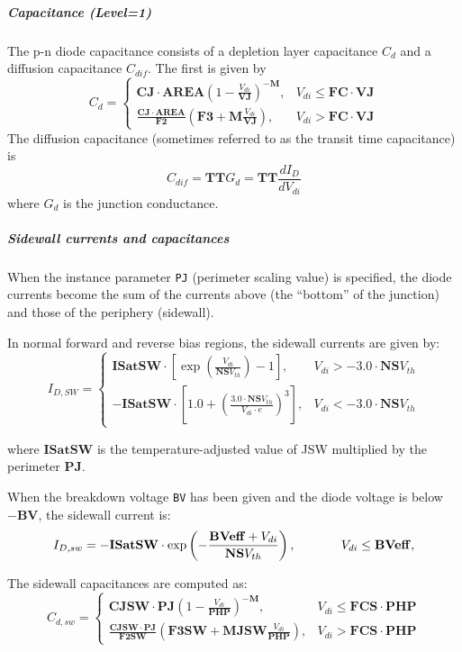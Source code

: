 \subparagraph{Capacitance (Level=1)}
The p-n diode capacitance consists of a depletion layer capacitance $C_d$ and a
diffusion capacitance $C_{dif}$.  The first is given by
\[
C_d = \left\{ \begin{array}{ll}
\mathbf{CJ}\cdot\mathbf{AREA} \left(1-\frac{V_{di}}{\mathbf{VJ}} \right)^{-\mathbf{M}}, &
V_{di} \leq \mathbf{FC \cdot VJ} \\
\frac{\mathbf{CJ}\cdot\mathbf{AREA}}{\mathbf{F2}}\left(\mathbf{F3}+\mathbf{M}\frac{V_{di}}{\mathbf{VJ}}\right),
& V_{di} > \mathbf{FC \cdot VJ}
\end{array}
\right.
\]
The diffusion capacitance (sometimes referred to as the transit time
capacitance) is
\[
C_{dif} = \mathbf{TT}G_d = \mathbf{TT}\frac{dI_D}{dV_{di}}
\]
where $G_d$ is the junction conductance.

\subparagraph{Sidewall currents and capacitances}
When the instance parameter \texttt{PJ} (perimeter scaling value) is
specified, the diode currents become the sum of the currents above
(the ``bottom'' of the junction) and those of the periphery (sidewall).

In normal forward and reverse bias regions, the sidewall currents are given by:
$$
I_{D,SW} = \left\{ \begin{array}{ll}
\mathbf{ISatSW}\cdot\left[\exp \left(\frac{V_{di}}{\mathbf{NS}V_{th}}\right) - 1
\right], & V_{di} > -3.0\cdot\mathbf{NS}V_{th} \\
-\mathbf{ISatSW}\cdot\left[1.0 + \left(\frac{3.0\cdot\mathbf{NS}V_{th}}{V_{di}\cdot
e}\right)^3\right], & V_{di} < -3.0\cdot\mathbf{NS}V_{th}
\end{array}
\right.
$$

where $\mathbf{ISatSW}$ is the temperature-adjusted value of JSW multiplied
by the perimeter $\mathbf{PJ}$.

When the breakdown voltage \texttt{BV} has been given and the diode voltage is below $-\mathbf{BV}$, the sidewall current is:
\[
I_{D,sw} = -\mathbf{ISatSW}\cdot\exp \left(-\frac{\mathbf{BVeff} + V_{di}}{\mathbf{NS}V_{th}}
\right), \hspace*{0.5in} V_{di} \leq \mathbf{BVeff},
\]

The sidewall capacitances are computed as:
\[
C_{d,sw} = \left\{ \begin{array}{ll}
\mathbf{CJSW}\cdot\mathbf{PJ} \left(1-\frac{V_{di}}{\mathbf{PHP}} \right)^{-\mathbf{M}}, &
V_{di} \leq \mathbf{FCS \cdot PHP} \\
\frac{\mathbf{CJSW}\cdot\mathbf{PJ}}{\mathbf{F2SW}}\left(\mathbf{F3SW}+\mathbf{MJSW}\frac{V_{di}}{\mathbf{PHP}}\right),
& V_{di} > \mathbf{FCS \cdot PHP}
\end{array}
\right.
\]


